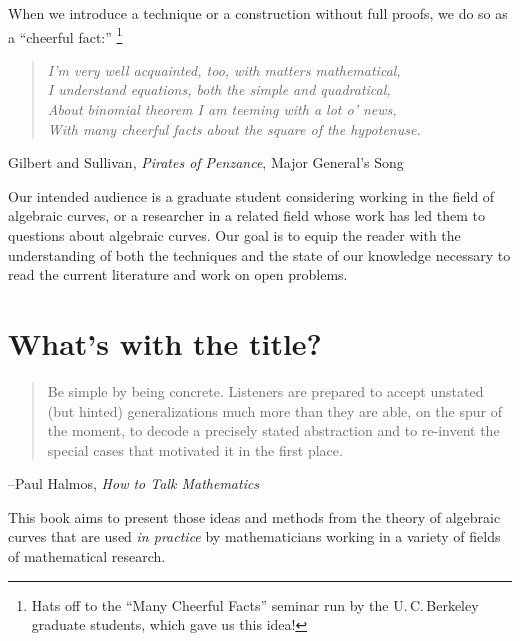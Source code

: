 When we introduce a technique or a construction without full proofs,
we do so as a ``cheerful fact:''%
\footnote{Hats off to the ``Many Cheerful Facts'' seminar run
by the
U.\,C.\,Berkeley
%
graduate students, which gave us this idea!}

\begin{quote}\it{I'm very well acquainted, too, with matters mathematical,\\
I understand equations, both the simple and quadratical,\\
About binomial theorem I am teeming with a lot o' news,\\
With many cheerful facts about the square of the hypotenuse.}
%
%
\end{quote}
\emdash Gilbert and Sullivan, {\it Pirates of Penzance}, Major General's Song

Our intended audience is a graduate student considering working in the field of algebraic curves, or a researcher in a related field whose work has led them to questions about algebraic curves. Our goal is to equip the reader with the understanding of both the techniques and the state of our knowledge necessary to read the current literature and work on open problems.

\section*{What's with the title?}

\begin{quote}
Be simple by being concrete. Listeners are prepared to
accept unstated (but hinted) generalizations much more than they are able, on the spur of the moment, to
decode a precisely stated abstraction and to re-invent the special cases that motivated it in the first place. 
\end{quote}

--Paul Halmos, {\it How to Talk Mathematics}
%

This book aims to present those ideas and methods from the theory of
algebraic curves that are used \emph{in practice} by mathematicians
working in a variety of fields of mathematical research.

